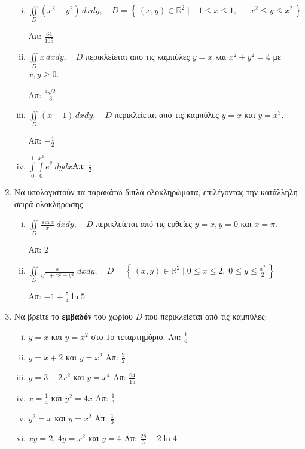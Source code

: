 \begin{enumerate}
\begin{enumerate}[i)]
\item $\iint\limits_{D}(x^2-y^2)\,dxdy,\quad D=\left\{\,(x,y)\in\mathbb{R}^2 \mid -1\leq x\leq 1,\;-x^2\leq y\leq x^2\,\right\}$  

\hfill Απ: $\frac{64}{105}$
\item $\iint\limits_{D}x\,dxdy, \quad D$ περικλείεται από τις καμπύλες $y=x$ και $x^2+y^2=4$ με $x,y\geq 0$.

\hfill Απ: $\frac{4\sqrt{2}}{3}$

\item $\iint\limits_{D}(x-1)\,dxdy,\quad D$ περικλείεται από τις καμπύλες $y=x$ και $y=x^3$. 

\hfill Απ: $-\frac{1}{2}$

\item $\int\limits_0^1\int\limits_0^{x^2}e^{\frac{y}{x}}\,dydx$\hfill Απ: $\frac{1}{2}$


\end{enumerate}





\item Να υπολογιστούν τα παρακάτω διπλά ολοκληρώματα, επιλέγοντας την κατάλληλη σειρά ολοκλήρωσης.

\begin{enumerate}[i)]

\item $\iint\limits_{D}\frac{\sin x}{x}\,dxdy,\quad D$ περικλείεται από τις ευθείες $y=x, y=0$ και $x=\pi$.

\hfill Απ: $2$

\item $\iint\limits_{D}\frac{x}{\sqrt{1+x^2+y^2}}\,dxdy,\quad D=\left\{\,(x,y)\in\mathbb{R}^2\mid 0\leq x\leq 2,\; 0\leq y\leq \frac{x^2}{2}\,\right\}$

\hfill Απ: $-1+\frac{5}{4}\ln 5$

\end{enumerate}


\vspace{\baselineskip}


\item Να βρείτε το \textbf{εμβαδόν} του χωρίου $D$ που περικλείεται από τις καμπύλες: 

\begin{enumerate}[i)]

\item $y=x$ και $y=x^2$ στο $1$ο τεταρτημόριο. \hfill Απ: $\frac{1}{6}$
\item $y=x+2$ και $y=x^2$ \hfill Απ: $\frac{9}{2}$
\item $y=3-2x^2$ και $y=x^4$ \hfill Απ: $\frac{64}{15}$
\item $x=\frac{1}{4}$ και $y^2=4x$ \hfill Απ: $\frac{1}{3}$
\item $y^2=x$ και $y=x^2$ \hfill Απ: $\frac{1}{3}$
\item $xy=2$, $4y=x^2$ και $y=4$ \hfill Απ: $\frac{28}{3}-2\ln 4$


\end{enumerate}
\end{enumerate}
